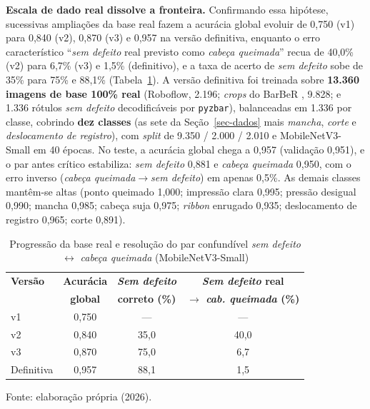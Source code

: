 \documentclass[
	article,			%
	11pt,				%
	oneside,			%
	a4paper,			%
	english,			%
	brazilian,			%
	sumario=tradicional
	]{abntex2}
\begin{document}
\noindent\textbf{Escala de dado real dissolve a fronteira.} Confirmando essa hipótese,
sucessivas ampliações da base real fazem a acurácia global evoluir de 0,750 (v1) para
0,840 (v2), 0,870 (v3) e 0,957 na versão definitiva, enquanto o erro característico
``\emph{sem defeito} real previsto como \emph{cabeça queimada}'' recua de 40,0\% (v2)
para 6,7\% (v3) e 1,5\% (definitivo), e a taxa de acerto de \emph{sem defeito} sobe de
35\% para 75\% e 88,1\% (Tabela~\ref{tab-progressao}). A versão definitiva foi treinada
sobre \textbf{13.360 imagens de base 100\% real} (Roboflow, 2.196; \textit{crops} do
BarBeR \cite{duan2025barcode}, 9.828; e 1.336 rótulos \emph{sem defeito} decodificáveis
por \texttt{pyzbar}), balanceadas em 1.336 por classe, cobrindo \textbf{dez classes}
(as sete da Seção~\ref{sec-dados} mais \emph{mancha}, \emph{corte} e \emph{deslocamento
de registro}), com \textit{split} de 9.350 / 2.000 / 2.010 e MobileNetV3-Small em 40
épocas. No teste, a acurácia global chega a 0,957 (validação 0,951), e o par antes
crítico estabiliza: \emph{sem defeito} 0,881 e \emph{cabeça queimada} 0,950, com o erro
inverso (\emph{cabeça queimada}$\rightarrow$\emph{sem defeito}) em apenas 0,5\%. As
demais classes mantêm-se altas (ponto queimado 1,000; impressão clara 0,995; pressão
desigual 0,990; mancha 0,985; cabeça suja 0,975; \textit{ribbon} enrugado 0,935;
deslocamento de registro 0,965; corte 0,891).

\begin{table}[htb]
\centering
\caption{Progressão da base real e resolução do par confundível \emph{sem defeito}
$\leftrightarrow$ \emph{cabeça queimada} (MobileNetV3-Small)}
\label{tab-progressao}
\footnotesize
\begin{tabular}{@{}lccc@{}}
\toprule
\textbf{Versão} & \textbf{Acurácia} & \textbf{\emph{Sem defeito}} & \textbf{\emph{Sem defeito} real}\\
                & \textbf{global}   & \textbf{correto (\%)}       & \textbf{$\rightarrow$ \emph{cab. queimada} (\%)}\\
\midrule
v1          & 0,750 & ---   & ---\\
v2          & 0,840 & 35,0  & 40,0\\
v3          & 0,870 & 75,0  & 6,7\\
Definitiva  & 0,957 & 88,1  & 1,5\\
\bottomrule
\end{tabular}

\vspace{2pt}
{\footnotesize Fonte: elaboração própria (2026).}
\end{table}
\end{document}
